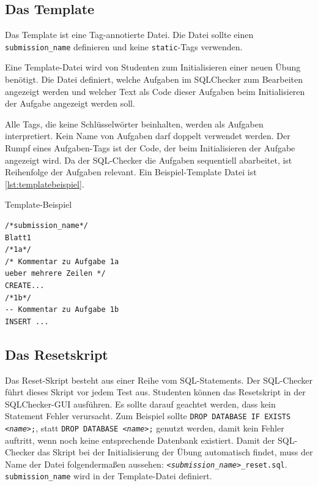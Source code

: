 \documentclass[11pt]{article}
\begin{document}
\subsection{Das Template}
Das Template ist eine Tag-annotierte Datei. Die Datei sollte einen \texttt{submission\_name} definieren und keine \texttt{static}-Tags verwenden. 

Eine Template-Datei wird von Studenten zum Initialisieren einer neuen Übung benötigt. Die Datei definiert, welche Aufgaben im SQLChecker zum Bearbeiten angezeigt werden und welcher Text als Code dieser Aufgaben beim Initialisieren der Aufgabe angezeigt werden soll.

Alle Tags, die keine Schlüsselwörter beinhalten, werden als Aufgaben interpretiert. Kein Name von Aufgaben darf doppelt verwendet werden. Der Rumpf eines Aufgaben-Tags ist der Code, der beim Initialisieren der Aufgabe angezeigt wird. Da der SQL-Checker die Aufgaben sequentiell abarbeitet, ist Reihenfolge der Aufgaben relevant.
Ein Beispiel-Template Datei ist \ref{lst:templatebeispiel}.

\begin{listing}
	\caption{Template-Beispiel}
	\label{lst:templatebeispiel}
\begin{verbatim}
/*submission_name*/
Blatt1
/*1a*/
/* Kommentar zu Aufgabe 1a
ueber mehrere Zeilen */
CREATE...
/*1b*/
-- Kommentar zu Aufgabe 1b
INSERT ...
\end{verbatim}
\end{listing}

\subsection{Das Resetskript}
Das Reset-Skript besteht aus einer Reihe vom SQL-Statements. Der SQL-Checker führt dieses Skript vor jedem Test aus. Studenten können das Resetskript in der SQLChecker-GUI ausführen. Es sollte darauf geachtet werden, dass kein Statement Fehler verursacht. Zum Beispiel sollte \texttt{DROP DATABASE IF EXISTS \textit{<name>};}, statt \texttt{DROP DATABASE \textit{<name>};} genutzt werden, damit kein Fehler auftritt, wenn noch keine entsprechende Datenbank existiert. Damit der SQL-Checker das Skript bei der Initialisierung der Übung automatisch findet, muss der Name der Datei folgendermaßen aussehen: \texttt{\textit{<submission\_name>}\_reset.sql}. \texttt{submission\_name} wird in der Template-Datei definiert.
\end{document}
